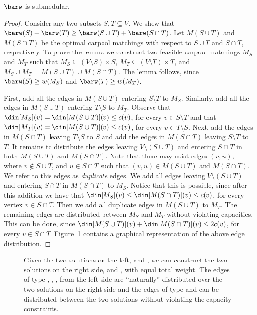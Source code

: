 \begin{lemma}
$\barw$ is submodular.
\end{lemma}
\begin{proof}
Consider any two subsets $S, T \subseteq V$.  We show that $\barw(S)
+ \barw(T) \geq \barw(S \cup T) + \barw(S \cap T)$.
%
Let $M(S \cup T)$ and $M(S \cap T)$ be the optimal carpool matchings
with respect to $S \cup T$ and $S \cap T$, respectively.
%
To prove the lemma we construct two feasible carpool matchings $M_S$
and $M_T$ such that $M_S \subseteq (V \setminus S) \times S$,
$M_T \subseteq (V \setminus T) \times T$, and $M_S \cup M_T = M(S \cup
T) \cup M(S \cap T)$.
%
The lemma follows, since $\barw(S) \geq w(M_S)$ and $\barw(T) \geq
w(M_T)$.

First, add all the edges in $M(S \cup T)$ entering $S \setminus T$ to
$M_S$.  Similarly, add all the edges in $M(S \cup T)$ entering
$T \setminus S$ to $M_T$.  Observe that $\din[M_S](v) = \din[M(S \cup
T)](v) \leq c(v)$, for every $v \in S \setminus T$ and that
$\din[M_T](v) = \din[M(S \cup T)](v) \leq c(v)$, for every $v \in
T \setminus S$.
%
Next, add the edges in $M(S \cap T)$ leaving $T \setminus S$ to $S$
and add the edges in $M(S \cap T)$ leaving $S \setminus T$ to $T$.
%
It remains to distribute the edges leaving $V \setminus (S \cup T)$
and entering $S \cap T$ in both $M(S \cup T)$ and $M(S \cap T)$.  Note
that there may exist edges $(v,u)$, where $v \not\in S \cup T$, and
$u \in S \cap T$ such that $(v,u) \in M(S \cup T)$ and $M(S \cap T)$.
We refer to this edges as \emph{duplicate} edges.
%
We add all edges leaving $V \setminus (S \cup T)$ and entering $S \cap
T$ in $M(S \cap T)$ to $M_S$.  Notice that this is possible, since
after this addition we have that $\din[M_S](v) \leq \din[M(S \cap
T)](v) \leq c(v)$, for every vertex $v \in S \cap T$.
%
Then we add all duplicate edges in $M(S \cup T)$ to $M_T$.
%
The remaining edges are distributed between $M_S$ and $M_T$ without
violating capacities.  This can be done, since $\din[M(S \cup T)](v)
+ \din[M(S \cap T)](v) \leq 2c(v)$, for every $v \in S \cap T$.
%
Figure~\ref{fig:sub} contains a graphical representation of the above
edge distribution.
\end{proof}

\begin{figure}
\centering
{}
\caption[]{%
Given the two solutions on the left, 
 and , we
can construct the two solutions on the right side,
 and , with equal total weight.
The edges of type 
, 
, 
, 
from the left side are ``naturally'' distributed over the two solutions on the
right side and the edges of type  and  can be
distributed between the two solutions without violating the capacity constraints.
}
\label{fig:sub}
\end{figure}


